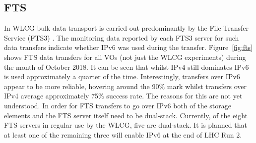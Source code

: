 \subsection{FTS}

In WLCG bulk data transport is carried out predominantly by the File Transfer Service (FTS3)  \cite{638647551}. The monitoring data reported by each FTS3 server for such data transfers indicate whether IPv6 was used during the transfer. Figure~\ref{fig:fts} shows FTS data transfers \cite{grafana-FTS} for all VOs (not just the WLCG experiments) during the month of October 2018. It can be seen that whilst IPv4 still dominates IPv6 is used approximately a quarter of the time. Interestingly, transfers over IPv6 appear to be more reliable, hovering around the 90\% mark whilst transfers over IPv4 average approximately 75\% success rate. The reasons for this are not yet understood.
In order for FTS transfers to go over IPv6 both of the storage elements and the FTS server itself need to be dual-stack. Currently, of the eight FTS servers in regular use by the WLCG, five are dual-stack. It is planned that at least one of the remaining three will enable IPv6 at the end of LHC Run 2.

